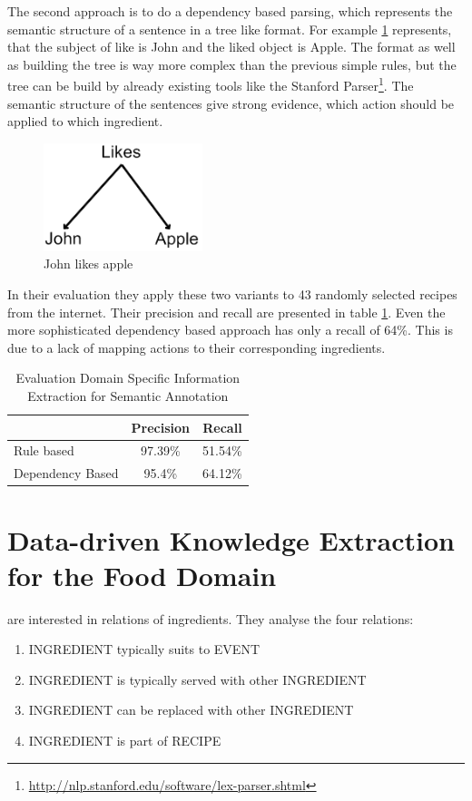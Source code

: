 \documentclass[12pt, twoside]{report}
\begin{document}
The second approach is to do a dependency based parsing, which represents the semantic structure of a sentence in a tree like format. For example \cref{fig:johnLikesApple} represents, that the subject of like is John and the liked object is Apple.
The format as well as building the tree is way more complex than the previous simple rules, but the tree can be build by already existing tools like the Stanford Parser\footnote{\url{http://nlp.stanford.edu/software/lex-parser.shtml}}. The semantic structure of the sentences give strong evidence, which action should be applied to which ingredient.

\begin{figure}[H]
	\centering
	\includegraphics[]{Images/JohnLikesApple}
	\caption{John likes apple \parencite{GrammaBased}}
	\label{fig:johnLikesApple}
\end{figure}

In their evaluation they apply these two variants to 43 randomly selected recipes from the internet. Their precision and recall are presented in table \ref{tab:masterEval}. Even the more sophisticated dependency based approach has only a recall of 64\%. This is due to a lack of mapping actions to their corresponding ingredients.

\begin{table}[H]
	\centering
	\begin{tabular}{ l | c | r } 
		& Precision & Recall \\
		\hline
		Rule based & 97.39\% & 51.54\% \\
		Dependency Based & 95.4\% & 64.12\% \\
	\end{tabular}
	\caption{Evaluation Domain Specific Information Extraction for Semantic Annotation}
	\label{tab:masterEval}
\end{table}


\section{Data-driven Knowledge Extraction for the Food Domain}
\parencite{konvens07_wiegand12o} are interested in relations of ingredients. They analyse the four relations:
\begin{enumerate}
	\item INGREDIENT typically suits to EVENT
	\item INGREDIENT is typically served with other INGREDIENT
	\item INGREDIENT can be replaced with other INGREDIENT
	\item INGREDIENT is part of RECIPE
\end{enumerate}
\end{document}
